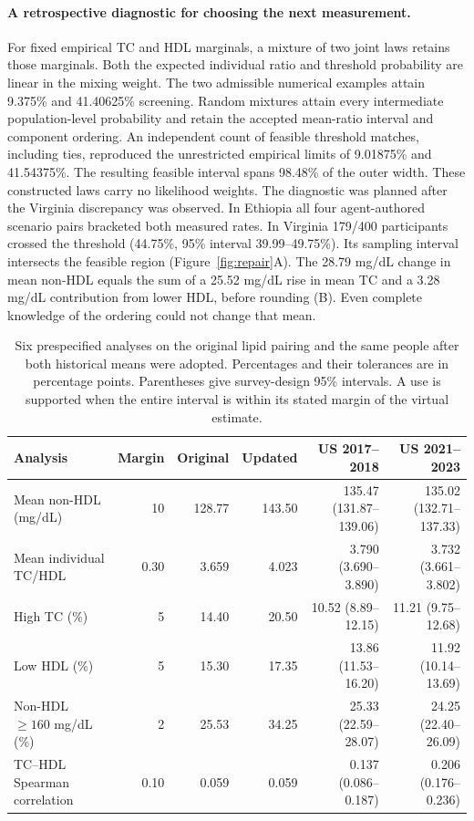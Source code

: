 \paragraph{A retrospective diagnostic for choosing the next measurement.}
For fixed empirical TC and HDL marginals, a mixture of two joint laws retains those marginals. Both the expected individual ratio and threshold probability are linear in the mixing weight. The two admissible numerical examples attain 9.375\% and 41.40625\% screening. Random mixtures attain every intermediate population-level probability and retain the accepted mean-ratio interval and component ordering. An independent count of feasible threshold matches, including ties, reproduced the unrestricted empirical limits of 9.01875\% and 41.54375\%. The resulting feasible interval spans 98.48\% of the outer width. These constructed laws carry no likelihood weights. The diagnostic was planned after the Virginia discrepancy was observed. In Ethiopia all four agent-authored scenario pairs bracketed both measured rates. In Virginia 179/400 participants crossed the threshold (44.75\%, 95\% interval 39.99--49.75\%). Its sampling interval intersects the feasible region (Figure~\ref{fig:repair}A). The 28.79 mg/dL change in mean non-HDL equals the sum of a 25.52 mg/dL rise in mean TC and a 3.28 mg/dL contribution from lower HDL, before rounding (B). Even complete knowledge of the ordering could not change that mean.

\begin{table}[t]
\centering
\caption{Six prespecified analyses on the original lipid pairing and the same people after both historical means were adopted. Percentages and their tolerances are in percentage points. Parentheses give survey-design 95\% intervals. A use is supported when the entire interval is within its stated margin of the virtual estimate.}
\label{tab:historicalmeans}
\small
\begin{tabular}{lrrrrr}
\toprule
Analysis & Margin & Original & Updated & US 2017--2018 & US 2021--2023 \\
\midrule
Mean non-HDL (mg/dL) & 10 & 128.77 & 143.50 & 135.47 (131.87--139.06) & 135.02 (132.71--137.33)\\
Mean individual TC/HDL & 0.30 & 3.659 & 4.023 & 3.790 (3.690--3.890) & 3.732 (3.661--3.802)\\
High TC (\%) & 5 & 14.40 & 20.50 & 10.52 (8.89--12.15) & 11.21 (9.75--12.68)\\
Low HDL (\%) & 5 & 15.30 & 17.35 & 13.86 (11.53--16.20) & 11.92 (10.14--13.69)\\
Non-HDL $\geq160$ mg/dL (\%) & 2 & 25.53 & 34.25 & 25.33 (22.59--28.07) & 24.25 (22.40--26.09)\\
TC--HDL Spearman correlation & 0.10 & 0.059 & 0.059 & 0.137 (0.086--0.187) & 0.206 (0.176--0.236)\\
\bottomrule
\end{tabular}
\end{table}

